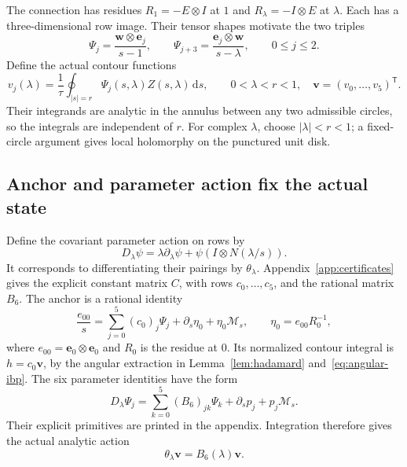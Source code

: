 \documentclass[11pt,a4paper]{article}
\newcommand{\dd}{\mathrm d}
\newcommand{\tr}{\mathsf T}
\newcommand{\e}{\mathbf e}
\newcommand{\vv}{\mathbf v}
\newcommand{\ww}{\mathbf w}
\begin{document}
The connection has residues $R_1=-E\otimes I$ at $1$ and
$R_\lambda=-I\otimes E$ at $\lambda$. Each has a three-dimensional
row image. Their tensor shapes motivate the two triples
\begin{equation}\label{eq:nf-basis}
 \Psi_j=\frac{\ww\otimes\e_j}{s-1},\qquad
 \Psi_{j+3}=\frac{\e_j\otimes\ww}{s-\lambda},\qquad 0\leq j\leq2.
\end{equation}
Define the actual contour functions
\begin{equation}\label{eq:v-definition}
 v_j(\lambda)=\frac1\tau\oint_{|s|=r}
       \Psi_j(s,\lambda)Z(s,\lambda)\,\dd s,
       \qquad 0<\lambda<r<1,
 \quad \vv=(v_0,\ldots,v_5)^{\tr}.
\end{equation}
Their integrands are analytic in the annulus between any two admissible
circles, so the integrals are independent of $r$. For complex $\lambda$,
choose $|\lambda|<r<1$; a fixed-circle argument gives local holomorphy
on the punctured unit disk.

\subsection{Anchor and parameter action fix the actual state}
Define the covariant parameter action on rows by
\[
 D_\lambda\psi=\lambda\partial_\lambda\psi+
                  \psi(I\otimes N(\lambda/s)).
\]
It corresponds to differentiating their pairings by $\theta_\lambda$.
Appendix~\ref{app:certificates} gives the explicit constant matrix $C$,
with rows $c_0,\ldots,c_5$, and the rational matrix $B_6$.
The anchor is a rational identity
\[
 \frac{e_{00}}s=\sum_{j=0}^5(c_0)_j\Psi_j+
                  \partial_s\eta_0+\eta_0\mathcal M_s,
 \qquad \eta_0=e_{00}R_0^{-1},
\]
where $e_{00}=\e_0\otimes\e_0$ and $R_0$ is the residue at $0$.
Its normalized contour integral is $h=c_0\vv$, by the angular
extraction in Lemma~\ref{lem:hadamard} and~\eqref{eq:angular-ibp}.
The six parameter identities have the form
\[
 D_\lambda\Psi_j=\sum_{k=0}^5(B_6)_{jk}\Psi_k+
                    \partial_sp_j+p_j\mathcal M_s.
\]
Their explicit primitives are printed in the appendix. Integration
therefore gives the actual analytic action
\begin{equation}\label{eq:six-action}
 \theta_\lambda\vv=B_6(\lambda)\vv.
\end{equation}
\end{document}
